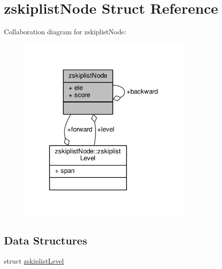 \hypertarget{structzskiplistNode}{}\section{zskiplist\+Node Struct Reference}
\label{structzskiplistNode}


Collaboration diagram for zskiplist\+Node\+:\nopagebreak
\begin{figure}[H]
\begin{center}
\leavevmode
\includegraphics[width=247pt]{structzskiplistNode__coll__graph}
\end{center}
\end{figure}
\subsection*{Data Structures}
\begin{DoxyCompactItemize}
\item 
struct \hyperlink{structzskiplistNode_structzskiplistNode_1_1zskiplistLevel}{zskiplist\+Level}
\end{DoxyCompactItemize}
